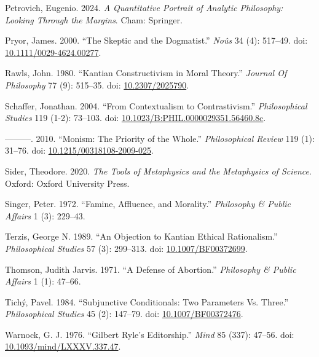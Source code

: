 \documentclass[
  10pt,
  letterpaper,
  DIV=11,
  numbers=noendperiod,
  twoside]{scrartcl}
\newlength{\cslhangindent}
\newenvironment{CSLReferences}[2] %
 {\begin{list}{}{%
  \setlength{\itemindent}{0pt}
  \setlength{\leftmargin}{0pt}
  \setlength{\parsep}{0pt}
  \ifodd #1
   \setlength{\leftmargin}{\cslhangindent}
   \setlength{\itemindent}{-1\cslhangindent}
  \fi
  \setlength{\itemsep}{#2\baselineskip}}}
 {\end{list}}
\begin{document}
\begin{CSLReferences}{1}{0}
Petrovich, Eugenio. 2024. \emph{A Quantitative Portrait of Analytic
Philosophy: Looking Through the Margins}. Cham: Springer.

Pryor, James. 2000. {``The Skeptic and the Dogmatist.''} \emph{Noûs} 34
(4): 517--49. doi:
\href{https://doi.org/10.1111/0029-4624.00277}{10.1111/0029-4624.00277}.

Rawls, John. 1980. {``Kantian Constructivism in Moral Theory.''}
\emph{Journal Of Philosophy} 77 (9): 515--35. doi:
\href{https://doi.org/10.2307/2025790}{10.2307/2025790}.

Schaffer, Jonathan. 2004. {``From Contextualism to Contrastivism.''}
\emph{Philosophical Studies} 119 (1-2): 73--103. doi:
\href{https://doi.org/10.1023/B:PHIL.0000029351.56460.8c}{10.1023/B:PHIL.0000029351.56460.8c}.

---------. 2010. {``Monism: The Priority of the Whole.''}
\emph{Philosophical Review} 119 (1): 31--76. doi:
\href{https://doi.org/10.1215/00318108-2009-025}{10.1215/00318108-2009-025}.

Sider, Theodore. 2020. \emph{The Tools of Metaphysics and the
Metaphysics of Science}. Oxford: Oxford University Press.

Singer, Peter. 1972. {``Famine, Affluence, and Morality.''}
\emph{Philosophy \& Public Affairs} 1 (3): 229--43.

Terzis, George N. 1989. {``An Objection to Kantian Ethical
Rationalism.''} \emph{Philosophical Studies} 57 (3): 299--313. doi:
\href{https://doi.org/10.1007/BF00372699}{10.1007/BF00372699}.

Thomson, Judith Jarvis. 1971. {``A Defense of Abortion.''}
\emph{Philosophy \& Public Affairs} 1 (1): 47--66.

Tichý, Pavel. 1984. {``Subjunctive Conditionals: Two Parameters Vs.
Three.''} \emph{Philosophical Studies} 45 (2): 147--79. doi:
\href{https://doi.org/10.1007/BF00372476}{10.1007/BF00372476}.

Warnock, G. J. 1976. {``Gilbert Ryle's Editorship.''} \emph{Mind} 85
(337): 47--56. doi:
\href{https://doi.org/10.1093/mind/LXXXV.337.47}{10.1093/mind/LXXXV.337.47}.


\end{CSLReferences}
\end{document}
